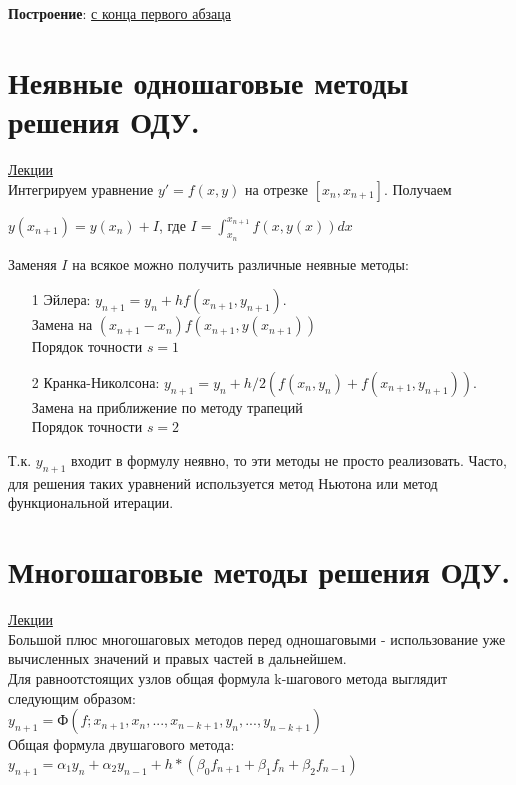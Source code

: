 \documentclass[specialist, subf, href, colorlinks=true, 12pt, times, mtpro, final]{disser}
\theoremstyle{definition}
\begin{document}
	\textbf{Построение}: \hyperlink {lects.89}{с конца первого абзаца}\\

\section {Неявные одношаговые методы решения ОДУ.}
	\hyperlink {lects.91}{Лекции}\\
	Интегрируем уравнение $y' = f (x,y)$ на отрезке $[x_n, x_{n+1}]$. Получаем
	\begin{center}
	$y(x_{n+1}) = y (x_n) + I$, где $I = \int^{x_{n+1}}_{x_n} f(x,y(x))dx$
	\end{center}
	Заменяя $I$ на всякое можно получить различные неявные методы:
	\begin{itemize}
	\item[1] Эйлера: $y_{n+1} = y_n + hf(x_{n+1}, y_{n+1})$. \\
	Замена на $(x_{n+1}-x_n)f(x_{n+1}, y(x_{n+1}))$\\
	Порядок точности $s=1$\\
	
	
	\item[2] Кранка-Николсона: $y_{n+1} = y_n + h/2(f(x_n,y_n) + f(x_{n+1}, y_{n+1}))$. \\
	Замена на приближение по методу трапеций\\
	Порядок точности $s=2$\\
	
	\end{itemize}
	
	Т.к. $y_{n+1}$ входит в формулу неявно, то эти методы не просто реализовать.  Часто, для решения таких уравнений используется метод Ньютона или метод функциональной итерации.
	

\section {Многошаговые методы решения ОДУ.}
	\hyperlink {lects.92}{Лекции}\\
	Большой плюс многошаговых методов перед одношаговыми - использование уже вычисленных значений и правых частей в дальнейшем.\\
	Для равноотстоящих узлов общая формула k-шагового метода выглядит следующим образом:\\
	$y_{n+1} = Ф(f;x_{n+1},x_n,...,x_{n-k+1},y_n,...,y_{n-k+1})$\\
	Общая формула двушагового метода:\\
	$y_{n+1} = \alpha_1y_n +\alpha_2y_{n-1} + h*(\beta_0f_{n+1} + \beta_1f_n + \beta_2f_{n-1})$\\ 
	
\end{document}
